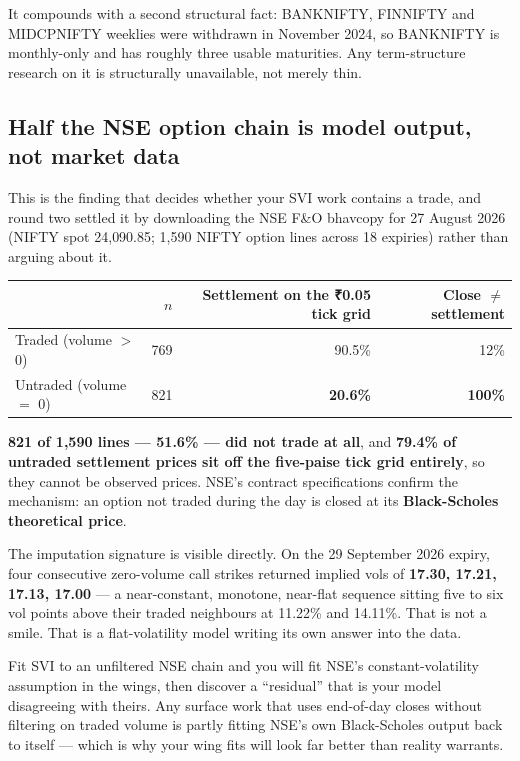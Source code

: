 \documentclass[11pt,a4paper]{article}
\newcommand{\rs}{₹}
\begin{document}
It compounds with a second structural fact: BANKNIFTY, FINNIFTY and MIDCPNIFTY
weeklies were withdrawn in November 2024, so BANKNIFTY is monthly-only and has
roughly three usable maturities. Any term-structure research on it is
structurally unavailable, not merely thin.

\subsection{Half the NSE option chain is model output, not market data}
\label{sec:imputed}

This is the finding that decides whether your SVI work contains a trade, and
round two settled it by downloading the NSE F\&O bhavcopy for 27 August 2026
(NIFTY spot 24{,}090.85; 1{,}590 NIFTY option lines across 18 expiries) rather
than arguing about it.

\begin{center}
\begin{tabular}{@{}lrrr@{}}
\toprule
& $n$ & Settlement on the \rs 0.05 tick grid & Close $\neq$ settlement \\
\midrule
Traded (volume $>$ 0)  & 769 & 90.5\% & 12\% \\
Untraded (volume $=$ 0) & 821 & \textbf{20.6\%} & \textbf{100\%} \\
\bottomrule
\end{tabular}
\end{center}

\textbf{821 of 1{,}590 lines --- 51.6\% --- did not trade at all}, and
\textbf{79.4\% of untraded settlement prices sit off the five-paise tick grid
entirely}, so they cannot be observed prices. NSE's contract specifications
confirm the mechanism: an option not traded during the day is closed at its
\textbf{Black-Scholes theoretical price}.

The imputation signature is visible directly. On the 29 September 2026 expiry,
four consecutive zero-volume call strikes returned implied vols of
\textbf{17.30, 17.21, 17.13, 17.00} --- a near-constant, monotone, near-flat
sequence sitting five to six vol points above their traded neighbours at 11.22\%
and 14.11\%. That is not a smile. That is a flat-volatility model writing its own
answer into the data.

\begin{waste}
Fit SVI to an unfiltered NSE chain and you will fit NSE's constant-volatility
assumption in the wings, then discover a ``residual'' that is your model
disagreeing with theirs. Any surface work that uses end-of-day closes without
filtering on traded volume is partly fitting NSE's own Black-Scholes output back
to itself --- which is why your wing fits will look far better than reality warrants.
\end{waste}
\end{document}
